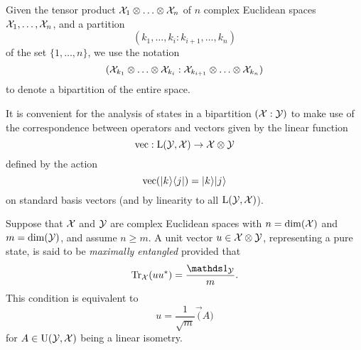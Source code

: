 Given the tensor product $\mathcal{X}_{1}\otimes\ldots\otimes\mathcal{X}_{n}$ of $n$ complex Euclidean spaces
$\mathcal{X}_{1},\ldots,\mathcal{X}_{n}$, and a partition 
\[ (k_{1},\ldots,k_{i} : k_{i+1},\ldots,k_{n}) \]
of the set $\{1, \ldots, n\}$, we use the notation 
\[ 
  (\mathcal{X}_{k_{1}}\otimes\ldots\otimes\mathcal{X}_{k_{i}} : \mathcal{X}_{k_{i+1}}\otimes\ldots\otimes\mathcal{X}_{k_{n}})
\]
to denote a bipartition of the entire space.

It is convenient for the analysis of states in a bipartition $(\mathcal{X}:\mathcal{Y})$ 
to make use of the correspondence between operators and vectors 
given by the linear function 
\begin{equation}
\label{eq:vec}
  \operatorname{vec} : \mathrm{L}(\mathcal{Y},\mathcal{X}) \rightarrow \mathcal{X}\otimes\mathcal{Y}
\end{equation}
defined by the action
\begin{equation}
  \operatorname{vec}(\lvert\mspace{0.5mu} k \mspace{0.5mu} \rangle\langle\mspace{0.5mu} j \mspace{0.5mu} \rvert) = \lvert\mspace{0.5mu} k \mspace{0.5mu} \rangle \lvert\mspace{0.5mu} j \mspace{0.5mu} \rangle
\end{equation}
on standard basis vectors (and by linearity to all $\mathrm{L}(\mathcal{Y},\mathcal{X})$).

\begin{definition}
\label{def:max-ent-states}
Suppose that $\mathcal{X}$ and $\mathcal{Y}$ are complex Euclidean spaces with $n = \dim(\mathcal{X})$ and 
$m = \dim(\mathcal{Y})$, and assume $n\geq m$.
A unit vector $u\in\mathcal{X}\otimes\mathcal{Y}$, representing a pure state, is said to be
\emph{maximally entangled} provided that
\begin{equation}
  \tr_{\X}(u u^{\ast}) = \frac{\I_{\Y}}{m}.
\end{equation}
This condition is equivalent to
\begin{equation}
  u = \frac{1}{\sqrt{m}} \vec(A)
\end{equation}
for $A\in\mathrm{U}(\mathcal{Y},\mathcal{X})$ being a linear isometry.
\end{definition}

